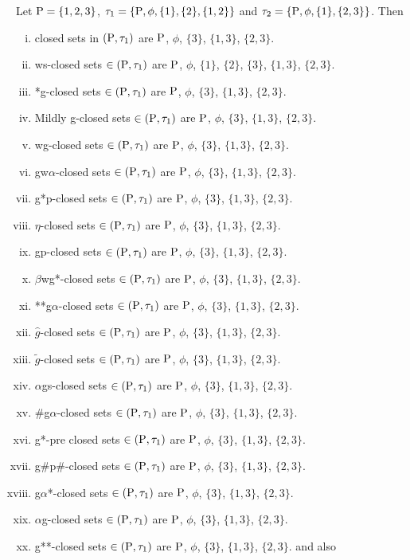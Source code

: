 \begin{exm}\label{exm2.2.17}
Let $\mathrm{P} = \{1, 2, 3\}$, $\tau_{1} = \{\mathrm{P}, \phi, \{1\}, \{2\},\{1, 2\}\}$ and $\tau_{2} = \{\mathrm{P}, \phi, \{1\}, \{2, 3\}\}$. Then
\begin{enumerate}[(i)]
\item closed sets in $(\mathrm{P}, \tau_{1})$ are $\mathrm{P}$, $\phi$, $\{3\}$, $\{1, 3\}$, $\{2, 3\}$.
\item ws-closed sets $\in(\mathrm{P}, \tau_{1})$ are $\mathrm{P}$, $\phi$, $\{1\}$, $\{2\}$, $\{3\}$, $\{1, 3\}$, $\{2, 3\}$.
\item *g-closed sets $\in(\mathrm{P}, \tau_{1})$ are $\mathrm{P}$, $\phi$, $\{3\}$, $\{1, 3\}$, $\{2, 3\}$.
\item Mildly g-closed sets $\in(\mathrm{P}, \tau_{1})$ are $\mathrm{P}$, $\phi$, $\{3\}$, $\{1, 3\}$, $\{2, 3\}$.
\item wg-closed sets $\in(\mathrm{P}, \tau_{1})$ are $\mathrm{P}$, $\phi$, $\{3\}$, $\{1, 3\}$, $\{2, 3\}$.
\item gw$\alpha$-closed sets $\in(\mathrm{P}, \tau_{1})$ are $\mathrm{P}$, $\phi$, $\{3\}$, $\{1, 3\}$, $\{2, 3\}$.
\item g*p-closed sets $\in(\mathrm{P}, \tau_{1})$ are $\mathrm{P}$, $\phi$, $\{3\}$, $\{1, 3\}$, $\{2, 3\}$.
\item $\eta$-closed sets $\in(\mathrm{P}, \tau_{1})$ are $\mathrm{P}$, $\phi$, $\{3\}$, $\{1, 3\}$, $\{2, 3\}$.
\item gp-closed sets $\in(\mathrm{P}, \tau_{1})$ are $\mathrm{P}$, $\phi$, $\{3\}$, $\{1, 3\}$, $\{2, 3\}$.
\item $\beta$wg*-closed sets $\in(\mathrm{P}, \tau_{1})$ are $\mathrm{P}$, $\phi$, $\{3\}$, $\{1, 3\}$, $\{2, 3\}$.
\item {*}{*}g$\alpha$-closed sets $\in(\mathrm{P}, \tau_{1})$ are $\mathrm{P}$, $\phi$, $\{3\}$, $\{1, 3\}$, $\{2, 3\}$.
\item $\hat{g}$-closed sets $\in(\mathrm{P}, \tau_{1})$ are $\mathrm{P}$, $\phi$, $\{3\}$, $\{1, 3\}$, $\{2, 3\}$.
\item $\tilde{g}$-closed sets $\in(\mathrm{P}, \tau_{1})$ are $\mathrm{P}$, $\phi$, $\{3\}$, $\{1, 3\}$, $\{2, 3\}$.
\item $\alpha$gs-closed sets $\in(\mathrm{P}, \tau_{1})$ are $\mathrm{P}$, $\phi$, $\{3\}$, $\{1, 3\}$, $\{2, 3\}$.
\item \#g$\alpha$-closed sets $\in(\mathrm{P}, \tau_{1})$ are $\mathrm{P}$, $\phi$, $\{3\}$, $\{1, 3\}$, $\{2, 3\}$.
\item g*-pre closed sets $\in(\mathrm{P}, \tau_{1} )$ are $\mathrm{P}$, $\phi$, $\{3\}$, $\{1, 3\}$, $\{2, 3\}$.
\item g\#p\#-closed sets $\in(\mathrm{P}, \tau_{1} )$ are $\mathrm{P}$, $\phi$, $\{3\}$, $\{1, 3\}$, $\{2, 3\}$.
\item g$\alpha$*-closed sets $\in(\mathrm{P}, \tau_{1} )$ are $\mathrm{P}$, $\phi$, $\{3\}$, $\{1, 3\}$, $\{2, 3\}$.
\item $\alpha$g-closed sets $\in(\mathrm{P}, \tau_{1})$ are $\mathrm{P}$, $\phi$, $\{3\}$, $\{1, 3\}$, $\{2, 3\}$.
\item g{*}{*}-closed sets $\in(\mathrm{P}, \tau_{1})$ are $\mathrm{P}$, $\phi$, $\{3\}$, $\{1, 3\}$, $\{2, 3\}$. and also
\end{enumerate}


\end{exm}
